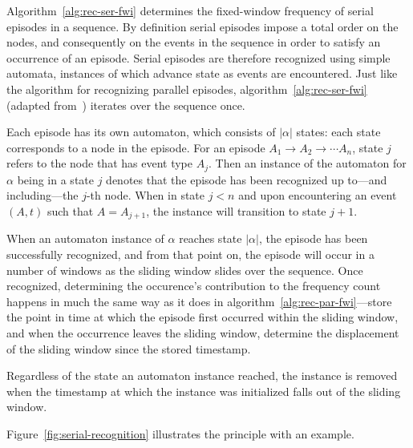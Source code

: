 \begin{algorithm}
\begin{algorithmic}[1]
\end{algorithmic}

\label{alg:rec-ser-fwi}
\end{algorithm}

Algorithm~\ref{alg:rec-ser-fwi} determines the fixed-window frequency of serial episodes in a sequence. By definition serial episodes impose a total order on the nodes, and consequently on the events in the sequence in order to satisfy an occurrence of an episode. Serial episodes are therefore recognized using simple automata, instances of which advance state as events are encountered. Just like the algorithm for recognizing parallel episodes, algorithm~\ref{alg:rec-ser-fwi} (adapted from~\cite{mannila1997discovery}) iterates over the sequence once.

Each episode has its own automaton, which consists of $ | \alpha | $ states: each state corresponds to a node in the episode. For an episode $ A_1 \to A_2 \to \cdots A_n $, state $ j $ refers to the node that has event type $ A_j $. Then an instance of the automaton for $ \alpha $ being in a state $ j $ denotes that the episode has been recognized up to---and including---the $ j $-th node. When in state $ j < n $ and upon encountering an event $ (A, t) $ such that $ A = A_{j + 1} $, the instance will transition to state $ j + 1 $.

When an automaton instance of $ \alpha $ reaches state $ | \alpha | $, the episode has been successfully recognized, and from that point on, the episode will occur in a number of windows as the sliding window slides over the sequence. Once recognized, determining the occurence's contribution to the frequency count happens in much the same way as it does in algorithm~\ref{alg:rec-par-fwi}---store the point in time at which the episode first occurred within the sliding window, and when the occurrence leaves the sliding window, determine the displacement of the sliding window since the stored timestamp.

Regardless of the state an automaton instance reached, the instance is removed when the timestamp at which the instance was initialized falls out of the sliding window.

Figure~\ref{fig:serial-recognition} illustrates the principle with an example.

